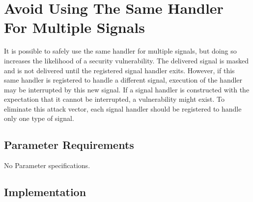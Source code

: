 %
%

\section{Avoid Using The Same Handler For Multiple Signals}
\label{AvoidUsingTheSameHandlerForMultipleSignals::overview}

It is possible to safely use the same handler for multiple signals, but doing so
increases the likelihood of a security vulnerability. The delivered signal is
masked and is not delivered until the registered signal handler exits. However,
if this same handler is registered to handle a different signal, execution of
the handler may be interrupted by this new signal. If a signal handler is
constructed with the expectation that it cannot be interrupted, a vulnerability
might exist. To eliminate this attack vector, each signal handler should be
registered to handle only one type of signal.

\subsection{Parameter Requirements}

   No Parameter specifications.

\subsection{Implementation}

